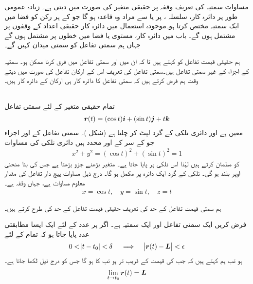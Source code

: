 مساوات   سمتیہ  کی تعریف وقفہ  پر  حقیقی متغیر  کی صورت میں دیتی ہے۔ زیادہ عمومی طور پر  دائرہ کار،   سلسلہ ،  پر   یا     سے مراد وہ قاعدہ ہو گا   جو  کے  ہر رکن کو فضا میں ایک سمتیہ مختص کرتا ہو۔موجودہ استعمال میں دائرہ کار حقیقی اعداد  کے وقفوں    پر مشتمل ہوں  گے۔ باب  میں دائرہ کار، مستوی یا فضا میں خطوں پر مشتمل ہوں گے   جہاں ہم  سمتی تفاعل کو سمتی میدان  کہیں گے۔

ہم حقیقی قیمت تفاعل کو  کہتے ہیں تا کہ ان میں اور سمتی تفاعل میں فرق کرنا ممکن ہو۔  سمتیہ  کے اجزاء   کے غیر سمتی تفاعل ہیں۔سمتی تفاعل کی تعریف  اس کے  ارکان تفاعل کی صورت میں دیتے وقت ہم فرض کرتے ہیں کہ   سمتی تفاعل کا دائرہ کار ہی  ارکان کے دائرہ کار   ہیں۔

\\
تمام حقیقی متغیر   کے لئے سمتی تفاعل
\begin{align*}
{\ensuremath{{\boldsymbol{r}}}}(t)=(\cos t){\boldsymbol{i}}+(\sin t){\boldsymbol{j}}+t{\boldsymbol{k}}
\end{align*}
معین ہے اور     دائری نلکی  کے گرد  لپٹ کر چلتا ہے (شکل )۔  سمتی تفاعل  کے  اور  اجزاء  جو  کے سر  کے   اور  محدد ہیں   دائری نلکی  کی مساوات
\begin{align*}
x^2+y^2=(\cos t)^2+(\sin t)^2=1
\end{align*}
کو مطمئن کرتے ہیں لہٰذا  اس نلکی پر پایا جاتا ہے۔ متغیر  بڑھنے    جزو بڑھتا ہے  جس کی بنا   منحنی   اوپر بلند ہو گی۔ نلکی کے گرد ایک دائرہ   پر مکمل ہو گا۔  درج ذیل مساوات  پیچ دار تفاعل  کی مقدار معلوم  مساوات ہے، جہاں وقفہ  ہے۔
\begin{align*}
x=\cos t,\quad y=\sin t,\quad z=t
\end{align*}

ہم  سمتی  قیمت تفاعل کے حد کی تعریف  حقیقی قیمت تفاعل کے حد  کی طرح کرتے ہیں۔

فرض کریں  ایک سمتی تفاعل اور  ایک سمتیہ ہے۔ اگر  ہر عدد  کے لئے   ایک ایسا مطابقتی  عدد  پایا جاتا ہو کہ تمام  کے لئے
\begin{align*}
0<\abs{t-t_0}<\delta\quad \implies \quad \abs{{{\boldsymbol{r}}}(t)-{{\boldsymbol{L}}}}<\epsilon
\end{align*}
ہو تب ہم کہتے ہیں کہ جب   کی قیمت  کے قریب تر ہو تب   کا    ہو گا جس کو درج ذیل لکھا جاتا ہے۔
\begin{align*}
\lim_{t\to t_0}{{\boldsymbol{r}}}(t)={{\boldsymbol{L}}}
\end{align*}

